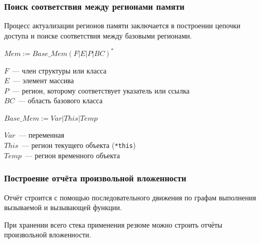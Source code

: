 \documentclass[hyperref={pdfpagelabels=false},10pt,gray]{beamer}
\begin{document}

\begin{frame}
\frametitle{Поиск соответствия между регионами памяти}
Процесс актуализации регионов памяти заключается в построении цепочки доступа и поиске соответствия между базовыми регионами.
\vspace{10pt}

$Mem := Base\_Mem(F|E|P|BC)^*$

\vspace{10pt}

$F$~--- член структуры или класса\\
$E$~--- элемент массива\\
$P$~--- регион, которому соответствует указатель или ссылка\\
$BC$~--- область базового класса

\vspace{10pt}

$Base\_Mem := Var|This|Temp$

\vspace{10pt}

$Var$~--- переменная\\
$This$~--- регион текущего объекта (\texttt{*this})\\
$Temp$~--- регион временного объекта


\end{frame}


\begin{frame}
\frametitle{Построение отчёта произвольной вложенности}
Отчёт строится с помощью последовательного движения по графам выполнения вызываемой и вызывающей функции.

При хранении всего стека применения резюме можно строить отчёты произвольной вложенности.
\begin{figure}[h]
\end{figure}
\end{frame}
\end{document}
